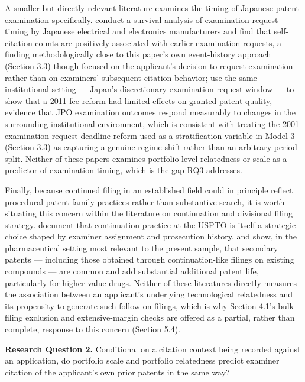 \documentclass[12pt]{article}
\begin{document}
A smaller but directly relevant literature examines the timing of Japanese patent examination specifically. \citet{nakatazhang2012} conduct a survival analysis of examination-request timing by Japanese electrical and electronics manufacturers and find that self-citation counts are positively associated with earlier examination requests, a finding methodologically close to this paper's own event-history approach (Section 3.3) though focused on the applicant's decision to request examination rather than on examiners' subsequent citation behavior; \citet{kaninishimura2025} use the same institutional setting --- Japan's discretionary examination-request window --- to show that a 2011 fee reform had limited effects on granted-patent quality, evidence that JPO examination outcomes respond measurably to changes in the surrounding institutional environment, which is consistent with treating the 2001 examination-request-deadline reform used as a stratification variable in Model 3 (Section 3.3) as capturing a genuine regime shift rather than an arbitrary period split. Neither of these papers examines portfolio-level relatedness or scale as a predictor of examination timing, which is the gap RQ3 addresses.

Finally, because continued filing in an established field could in principle reflect procedural patent-family practices rather than substantive search, it is worth situating this concern within the literature on continuation and divisional filing strategy. \citet{righisimcoe2020} document that continuation practice at the USPTO is itself a strategic choice shaped by examiner assignment and prosecution history, and \citet{kapczynski2012} show, in the pharmaceutical setting most relevant to the present sample, that secondary patents --- including those obtained through continuation-like filings on existing compounds --- are common and add substantial additional patent life, particularly for higher-value drugs. Neither of these literatures directly measures the association between an applicant's underlying technological relatedness and its propensity to generate such follow-on filings, which is why Section 4.1's bulk-filing exclusion and extensive-margin checks are offered as a partial, rather than complete, response to this concern (Section 5.4).

\medskip
\noindent \textbf{Research Question 2.} Conditional on a citation context being recorded against an application, do portfolio scale and portfolio relatedness predict examiner citation of the applicant's own prior patents in the same way?
\end{document}
